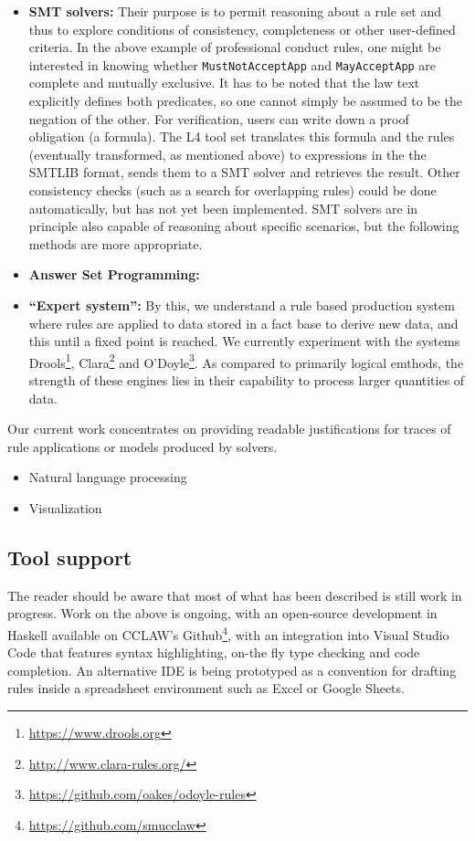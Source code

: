 \documentclass[runningheads]{llncs}
\begin{document}
\begin{itemize}
\item \textbf{SMT solvers:} Their purpose is to permit reasoning about a rule
  set and thus to explore conditions of consistency, completeness or other
  user-defined criteria. In the above example of professional conduct rules,
  one might be interested in knowing whether
  \texttt{MustNotAcceptApp} and \texttt{MayAcceptApp} are complete and
  mutually exclusive. It has to be noted that the law text explicitly defines
  both predicates, so one cannot simply be assumed to be the negation of the
  other. For verification, users can write down a proof obligation (a formula). The L4
  tool set translates this formula and the rules (eventually transformed, as
  mentioned above) to expressions in the the SMTLIB format, sends them to a
  SMT solver and retrieves the result.  Other consistency checks (such as a search for
  overlapping rules) could be done automatically, but has not yet been
  implemented. SMT solvers are in principle also capable of reasoning about
  specific scenarios, but the following methods are more appropriate.
\item \textbf{Answer Set Programming:}
\item \textbf{``Expert system'':} By this, we understand a rule based
  production system where rules are applied to data stored in a fact base to
  derive new data, and this until a fixed point is reached. We currently
  experiment with the systems Drools\footnote{\url{https://www.drools.org}},
  Clara\footnote{\url{http://www.clara-rules.org/}} and
  O'Doyle\footnote{\url{https://github.com/oakes/odoyle-rules}}. As compared
  to primarily logical emthods, the strength
  of these engines lies in their capability to process larger quantities of
  data.
\end{itemize}
Our current work concentrates on providing readable justifications for traces
of rule applications or models produced by solvers.


\begin{itemize}
\item Natural language processing
\item Visualization
\end{itemize}

\subsection{Tool support}\label{sec:tool_support}

The reader should be aware that most of what has been described is still work
in progress. Work on the above is ongoing, with an open-source development in
Haskell available on CCLAW's Github\footnote{\url{https://github.com/smucclaw}}, with an integration into
Visual Studio Code that features syntax highlighting, on-the fly type checking
and code completion. An alternative IDE is being prototyped as a convention for
drafting rules inside a spreadsheet environment such as Excel or Google Sheets.
\end{document}
